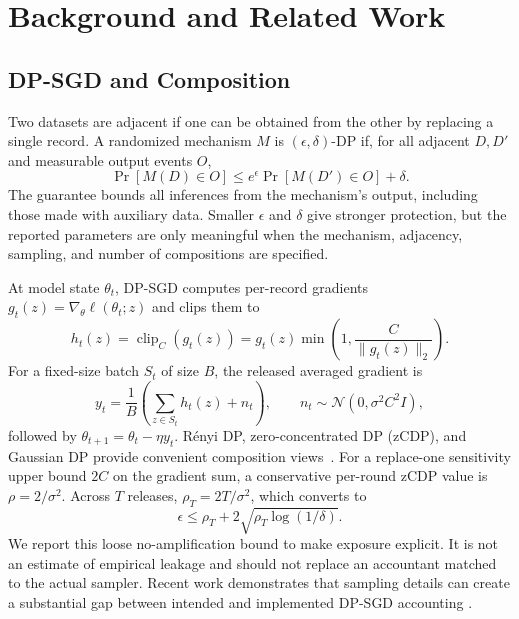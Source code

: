 \documentclass[conference]{IEEEtran}
\newcommand{\clip}{\operatorname{clip}}
\newcommand{\Normal}{\mathcal{N}}
\begin{document}
\section{Background and Related Work}

\subsection{DP-SGD and Composition}

Two datasets are adjacent if one can be obtained from the other by replacing a single record. A randomized mechanism $M$ is $(\epsilon,\delta)$-DP if, for all adjacent $D,D'$ and measurable output events $O$,
\begin{equation}
\Pr[M(D)\in O]\leq e^\epsilon\Pr[M(D')\in O]+\delta.
\end{equation}
The guarantee bounds all inferences from the mechanism's output, including those made with auxiliary data. Smaller $\epsilon$ and $\delta$ give stronger protection, but the reported parameters are only meaningful when the mechanism, adjacency, sampling, and number of compositions are specified.

At model state $\theta_t$, DP-SGD computes per-record gradients $g_t(z)=\nabla_\theta\ell(\theta_t;z)$ and clips them to
\begin{equation}
h_t(z)=\clip_C(g_t(z))=g_t(z)\min\left(1,\frac{C}{\lVert g_t(z)\rVert_2}\right).
\end{equation}
For a fixed-size batch $S_t$ of size $B$, the released averaged gradient is
\begin{equation}
y_t=\frac{1}{B}\left(\sum_{z\in S_t}h_t(z)+n_t\right),
\qquad n_t\sim\Normal(0,\sigma^2 C^2 I),
\label{eq:dpsgd}
\end{equation}
followed by $\theta_{t+1}=\theta_t-\eta y_t$. Rényi DP, zero-concentrated DP (zCDP), and Gaussian DP provide convenient composition views~\cite{mironov2017renyi,bun2016concentrated,dong2022gaussian}. For a replace-one sensitivity upper bound $2C$ on the gradient sum, a conservative per-round zCDP value is $\rho=2/\sigma^2$. Across $T$ releases, $\rho_T=2T/\sigma^2$, which converts to
\begin{equation}
\epsilon\leq \rho_T+2\sqrt{\rho_T\log(1/\delta)}.
\label{eq:zcdp}
\end{equation}
We report this loose no-amplification bound to make exposure explicit. It is not an estimate of empirical leakage and should not replace an accountant matched to the actual sampler. Recent work demonstrates that sampling details can create a substantial gap between intended and implemented DP-SGD accounting \cite{chua2024private}.
\end{document}
